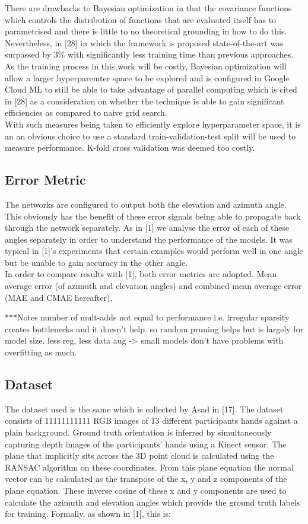 \documentclass{article}
\begin{document}
 There are drawbacks to Bayesian optimization in that the covariance functions which controls the distribution of functions that are evaluated itself has to parametrised and there is little to no theoretical grounding in how to do this. Nevertheless, in [28] in which the framework is proposed state-of-the-art was surpassed by 3\% with significantly less training time than previous approaches. As the training process in this work will be costly, Bayesian optimization will allow a larger hyperparemter space to be explored and is configured in Google Cloud ML to still be able to take advantage of parallel computing which is cited in [28] as a consideration on whether the technique is able to gain significant efficiencies as compared to naive grid search. \\
 
 With such measures being taken to efficiently explore hyperparameter space, it is an an obvious choice to use a standard train-validation-test split will be used to measure performance. K-fold cross validation was deemed too costly.\\

\subsection{Error Metric}
The networks are configured to output both the elevation and azimuth angle. This obviously has the benefit of these error signals being able to propagate back through the network separately. As in [1] we analyse the error of each of these angles separately in order to understand the performance of the models. It was typical in [1]'s experiments that certain examples would perform well in one angle but be unable to gain accuracy in the other angle.\\

In order to compare results with [1], both error metrics are adopted. Mean average error (of azimuth and elevation angles) and combined mean average error (MAE and CMAE hereafter).


***Notes
number of mult-adds not equal to performance i.e. irregular sparsity creates bottlenecks and it doesn't help. so random pruning helps but is largely for model size. less reg, less data aug -> small models don't have problems with overfitting as much.
\subsection*{Dataset}
The dataset used is the same which is collected by Asad in [17]. The dataset consists of 11111111111 RGB images of 13 different participants hands against a plain background. Ground truth orientation is inferred by simultaneously capturing depth images of the participants' hands using a Kinect sensor. The plane that implicitly sits across the 3D point cloud is calculated using the RANSAC algorithm on these coordinates. From this plane equation the normal vector can be calculated as the transpose of the x, y and z components of the plane equation. These inverse cosine of these x and y components are used to calculate the azimuth and elevation angles which provide the ground truth labels for training. Formally, as shown in [1], this is:
\end{document}
